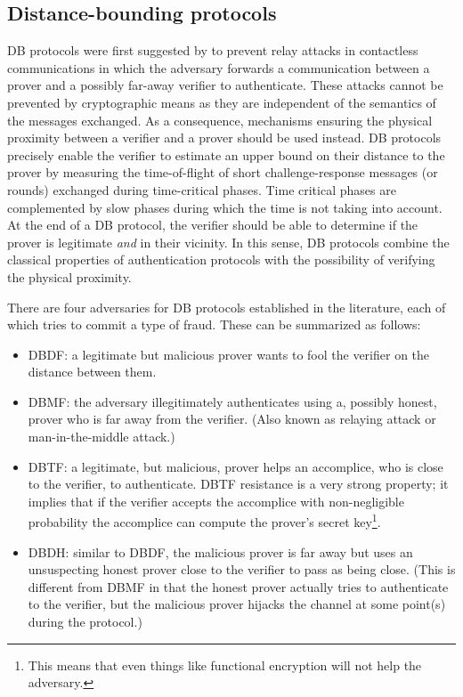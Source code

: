 \subsection{Distance-bounding protocols}%
\label{distance-bounding}

\Ac{DB} protocols were first suggested by \citet{DistanceBounding} to prevent relay attacks in contactless communications in which the adversary forwards a communication between a prover and a possibly far-away verifier to authenticate. 
These attacks cannot be prevented by cryptographic means as they are independent of the semantics of the messages exchanged.
As a consequence, mechanisms ensuring the physical proximity between a verifier and a prover should be used instead.
\Ac{DB} protocols precisely enable the verifier to estimate an upper bound on their distance to the prover by measuring the time-of-flight of short challenge-response messages (or rounds) exchanged during time-critical phases. 
Time critical phases are complemented by slow phases during which the time is not taking into account. 
At the end of a \Ac{DB} protocol, the verifier should be able to
determine if the prover is legitimate \emph{and} in their vicinity.
In this sense, \Ac{DB} protocols combine the classical properties of authentication protocols with the possibility of verifying the physical proximity.

There are four adversaries for \ac{DB} protocols established in the literature, 
each of which tries to commit a type of fraud.
These can be summarized as follows:
\begin{itemize}
  \item \Acf{DBDF}: a legitimate but malicious prover wants to fool the verifier on the distance between them.
  \item \Acf{DBMF}: the adversary illegitimately authenticates using a, 
    possibly honest, prover who is far away from the verifier.
    (Also known as relaying attack or man-in-the-middle attack.)
  \item \Acf{DBTF}: a legitimate, but malicious, prover helps an accomplice, 
    who is close to the verifier, to authenticate.
    \Ac{DBTF} resistance is a very strong property; it implies that if the 
    verifier accepts the accomplice with non-negligible probability the 
    accomplice can compute the prover's secret key\footnote{%
      This means that even things like functional encryption will not
      help the adversary.
    }.
  \item \Acf{DBDH}: similar to \ac{DBDF}, the malicious prover is far away but 
    uses an unsuspecting honest prover close to the verifier to pass as being 
    close.
    (This is different from \ac{DBMF} in that the honest prover actually tries 
    to authenticate to the verifier, but the malicious prover hijacks the 
    channel at some point(s) during the protocol.)
\end{itemize}

